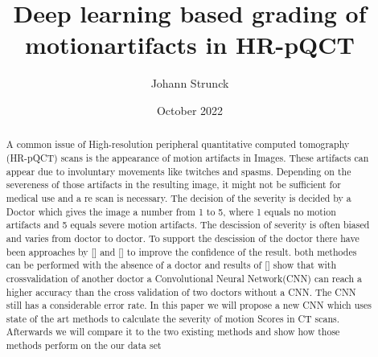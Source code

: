 \documentclass[acmsmall, review]{acmart}
\title{Deep learning based grading of motionartifacts in HR-pQCT}
\date{October 2022}
\author{Johann Strunck}
\begin{document}
\begin{abstract}
	A common issue of High-resolution peripheral quantitative computed tomography (HR-pQCT) scans is the appearance of motion artifacts in Images. These artifacts can appear due to involuntary movements like twitches and spasms. Depending on the severeness of those artifacts in the resulting image, it might not be sufficient for medical use and a re scan is necessary. The decision of the severity is decided by a Doctor which gives the image a number from 1 to 5, where 1 equals no motion artifacts and 5 equals severe motion artifacts. The descission of severity is often biased and varies from doctor to doctor. To support the descission of the doctor there have been approaches by [] and []  to improve the confidence of the result. both methodes can be performed with the absence of a doctor and results of [] show that with crossvalidation of another doctor a Convolutional Neural Network(CNN) can reach a higher accuracy than the cross validation of two doctors without a CNN. The CNN still has a considerable error rate. In this paper we will propose a new CNN which uses state of the art methods to calculate the severity of motion Scores in CT scans. Afterwards we will compare it to the two existing methods and show how those methods perform on the our data set
\end{abstract}
	\maketitle
\end{document}
